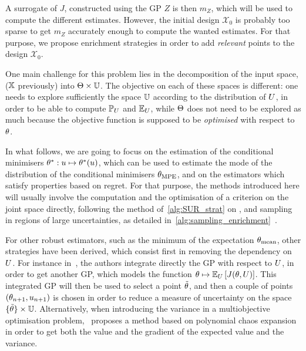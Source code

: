\documentclass[../../Main_ManuscritThese.tex]{subfiles}
\begin{document}
A surrogate of $J$, constructed using the GP $Z$ is then $m_Z$, which
will be used to compute the different estimates. However, the initial
design $\mathcal{X}_0$ is probably too sparse to get $m_Z$ accurately
enough to compute the wanted estimates. For that purpose, we propose
enrichment strategies in order to add \emph{relevant} points to the
design $\mathcal{X}_0$.

One main challenge for this problem lies in the decomposition of the
input space, ($\mathbb{X}$ previously) into $\Theta \times \mathbb{U}$. The
objective on each of these spaces is different: one needs to explore
sufficiently the space $\mathbb{U}$ according to the distribution of
$U$, in order to be able to compute $\mathbb{P}_{U}$ and $\mathbb{E}_{U}$,
while $\Theta$ does not need to be explored as much because the
objective function is supposed to be \emph{optimised} with respect to
$\theta$.

In what follows, we are going to focus on the estimation of the
conditional minimisers $\theta^*: u\mapsto \theta^*(u)$, which can be
used to estimate the mode of the distribution of the conditional
minimisers ${\theta}_{\mathrm{MPE}}$, and on the estimators which satisfy
properties based on regret.  For that purpose, the methods introduced
here will usually involve the computation and the optimisation of a
criterion on the joint space directly, following the method
of~\cref{alg:SUR_strat} on , and sampling in
regions of large uncertainties, as detailed
in~\cref{alg:sampling_enrichment}~.

For other robust estimators, such as the minimum of the expectation
${\theta}_{\mathrm{mean}}$, other strategies have been derived, which
consist first in removing the dependency on $U$. For instance
in~\cite{janusevskis_simultaneous_2010}, the authors integrate
directly the GP with respect to $U$, in order to get another GP,
which models the function
$\theta\mapsto \mathbb{E}_{U}\left[J(\theta, U)\right]$. This integrated GP
will then be used to select a point $\tilde{\theta}$, and then a couple
of points $(\theta_{n+1},u_{n+1})$ is chosen in order to reduce a
measure of uncertainty on the space $\{\tilde{\theta}\}\times \mathbb{U}$.
Alternatively, when introducing the variance in a multiobjective
optimisation problem,~\cite{miranda_adjoint-based_2016} proposes a
method based on polynomial chaos expansion in order to get both the
value and the gradient of the expected value and the variance.


\end{document}
